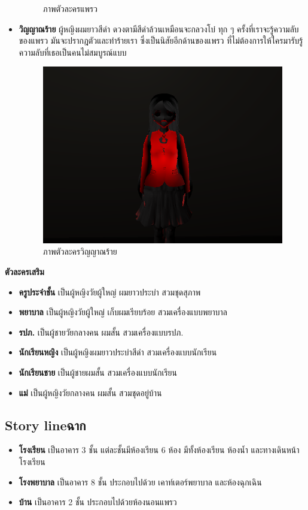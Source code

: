 \begin{itemize}
\begin{figure}[h]
        \caption{ภาพตัวละครแพรว}\label{PrawCharacter}
    \end{figure}
    \item \textbf{วิญญาณร้าย} ผู้หญิงผมยาวสีดำ ดวงตามีสีดำล้วนเหมือนจะกลวงโบ๋ ทุก ๆ ครั้งที่เราจะรู้ความลับของแพรว มันจะปรากฎตัวและทำร้ายเรา ซึ่งเป็นนิสัยอีกด้านของแพรว ที่ไม่ต้องการให้ใครมารับรู้ความลับที่เธอเป็นคนไม่สมบูรณ์แบบ
    \begin{figure}[h]
        \centering
        \includegraphics[scale=0.5]{Images/ghost image.png}
        \caption{ภาพตัวละครวิญญาณร้าย}\label{GhostCharacter}
    \end{figure}
\end{itemize}


\subitem \textbf{ตัวละครเสริม}
\begin{itemize}
    \item \textbf{ครูประจำชั้น} เป็นผู้หญิงวัยผู้ใหญ่  ผมยาวประบ่า สวมชุดสุภาพ
    \item \textbf{พยาบาล} เป็นผู้หญิงวัยผู้ใหญ่ เก็บผมเรียบร้อย สวมเครื่องแบบพยาบาล
    \item \textbf{รปภ.} เป็นผู้ชายวัยกลางคน ผมสั้น สวมเครื่องแบบรปภ.
    \item \textbf{นักเรียนหญิง} เป็นผู้หญิงผมยาวประบ่าสีดำ สวมเครื่องแบบนักเรียน
    \item \textbf{นักเรียนชาย} เป็นผู้ชายผมสั้น  สวมเครื่องแบบนักเรียน
    \item \textbf{แม่} เป็นผู้หญิงวัยกลางคน ผมสั้น สวมชุดอยู่บ้าน
\end{itemize}

\subsection{\ifenglish Story line\else ฉาก\fi }
\begin{itemize}
    \item \textbf{โรงเรียน} เป็นอาคาร 3 ชั้น แต่ละชั้นมีห้องเรียน 6 ห้อง มีทั้งห้องเรียน ห้องน้ำ และทางเดินหน้าโรงเรียน
    \item \textbf{โรงพยาบาล} เป็นอาคาร 8 ชั้น ประกอบไปด้วย เคาท์เตอร์พยาบาล และห้องฉุกเฉิน
    \item \textbf{บ้าน} เป็นอาคาร 2 ชั้น ประกอบไปด้วยห้องนอนแพรว
\end{itemize}

